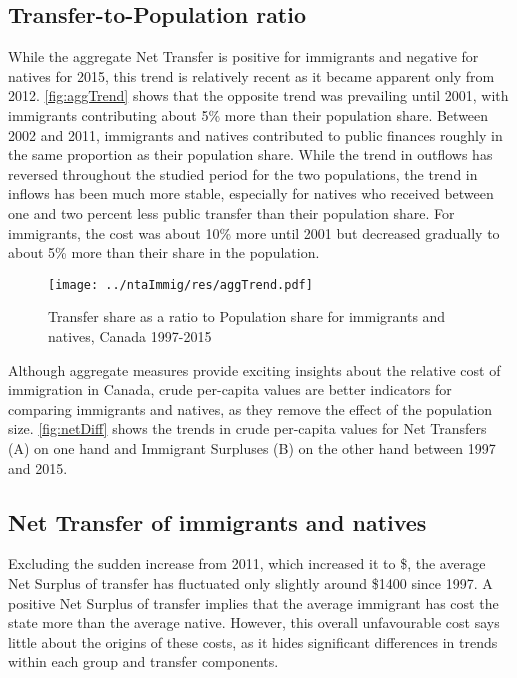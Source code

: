 \subsection{Transfer-to-Population ratio}
While the aggregate Net Transfer is positive for immigrants and negative for natives for 2015, this trend is relatively recent as it became apparent only from 2012.
\autoref{fig:aggTrend} shows that the opposite trend was prevailing until 2001, with immigrants contributing about 5\% more than their population share.
Between 2002 and 2011, immigrants and natives contributed to public finances roughly in the same proportion as their population share.
While the trend in outflows has reversed throughout the studied period for the two populations, the trend in inflows has been much more stable, especially for natives who received between one and two percent less public transfer than their population share.
For immigrants, the cost was about 10\% more until 2001 but decreased gradually to about 5\% more than their share in the population.

\begin{figure}[H]%
  \caption{Transfer share as a ratio to Population share for immigrants and natives, Canada 1997-2015}
  \texttt{[image: ../ntaImmig/res/aggTrend.pdf]}%
  \label{fig:aggTrend}%
\end{figure}%

Although aggregate measures provide exciting insights about the relative cost of immigration in Canada, crude per-capita values are better indicators for comparing immigrants and natives, as they remove the effect of the population size. \autoref{fig:netDiff} shows the trends in crude per-capita values for Net Transfers (A) on one hand and Immigrant Surpluses (B) on the other hand between 1997 and 2015.

\subsection{Net Transfer of immigrants and natives}
Excluding the sudden increase from 2011, which increased it to \$, the average Net Surplus of transfer has fluctuated only slightly around \$\num{1400} since 1997.
A positive Net Surplus of transfer implies that the average immigrant has cost the state more than the average native.
However, this overall unfavourable cost says little about the origins of these costs, as it hides significant differences in trends within each group and transfer components.

